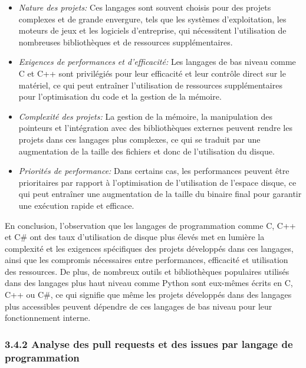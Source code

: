 \documentclass[
]{article}
\providecommand{\tightlist}{%
  \setlength{\itemsep}{0pt}\setlength{\parskip}{0pt}}
\begin{document}
\begin{itemize}
\tightlist
\item
  \emph{Nature des projets:} Ces langages sont souvent choisis pour des
  projets complexes et de grande envergure, tels que les systèmes
  d'exploitation, les moteurs de jeux et les logiciels d'entreprise, qui
  nécessitent l'utilisation de nombreuses bibliothèques et de ressources
  supplémentaires.
\item
  \emph{Exigences de performances et d'efficacité:} Les langages de bas
  niveau comme C et C++ sont privilégiés pour leur efficacité et leur
  contrôle direct sur le matériel, ce qui peut entraîner l'utilisation
  de ressources supplémentaires pour l'optimisation du code et la
  gestion de la mémoire.
\item
  \emph{Complexité des projets:} La gestion de la mémoire, la
  manipulation des pointeurs et l'intégration avec des bibliothèques
  externes peuvent rendre les projets dans ces langages plus complexes,
  ce qui se traduit par une augmentation de la taille des fichiers et
  donc de l'utilisation du disque.
\item
  \emph{Priorités de performance:} Dans certains cas, les performances
  peuvent être prioritaires par rapport à l'optimisation de
  l'utilisation de l'espace disque, ce qui peut entraîner une
  augmentation de la taille du binaire final pour garantir une exécution
  rapide et efficace.
\end{itemize}

En conclusion, l'observation que les langages de programmation comme C,
C++ et C\# ont des taux d'utilisation de disque plus élevés met en
lumière la complexité et les exigences spécifiques des projets
développés dans ces langages, ainsi que les compromis nécessaires entre
performances, efficacité et utilisation des ressources. De plus, de
nombreux outils et bibliothèques populaires utilisés dans des langages
plus haut niveau comme Python sont eux-mêmes écrits en C, C++ ou C\#, ce
qui signifie que même les projets développés dans des langages plus
accessibles peuvent dépendre de ces langages de bas niveau pour leur
fonctionnement interne.

\subsubsection{3.4.2 Analyse des pull requests et des issues par langage
de
programmation}\label{analyse-des-pull-requests-et-des-issues-par-langage-de-programmation}
\end{document}
